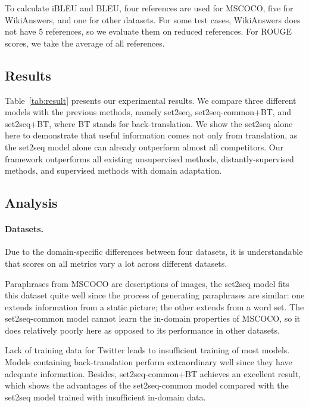 To calculate iBLEU and BLEU, four references are used for MSCOCO, five for WikiAnswers, and one for other datasets. For some test cases, WikiAnswers does not have 5 references, so we evaluate them on reduced references. 
For ROUGE scores, we take the average of all references.

\subsection{Results} \label{sec:result}

Table~\ref{tab:result} presents our experimental results. We compare three different models with the previous methods, 
namely set2seq, set2seq-common+BT, and set2seq+BT, where BT stands for 
back-translation. We show the set2seq alone here to demonstrate that
useful information comes not only from translation, as the
set2seq model alone can already outperform almost all competitors. 
Our framework outperforms all existing unsupervised methods, 
distantly-supervised methods, and supervised methods with domain adaptation. 

\subsection{Analysis} \label{sec:analysis}
\paragraph{Datasets. } Due to the domain-specific differences between four datasets, it is understandable that scores on all metrics vary a lot across different datasets. 

Paraphrases from MSCOCO are descriptions of images, the set2seq model fits this dataset quite well since the process of generating paraphrases are similar: 
one extends information from a static picture; 
the other extends from a word set. 
The set2seq-common model cannot learn the in-domain properties of MSCOCO, 
so it does relatively poorly here as opposed to its performance 
in other datasets. 

Lack of training data for Twitter leads to insufficient training of most models. Models containing back-translation perform extraordinary well since they have adequate information. Besides, set2seq-common+BT achieves an excellent result, which shows the advantages of the set2seq-common model compared with the set2seq model trained with insufficient in-domain data.

